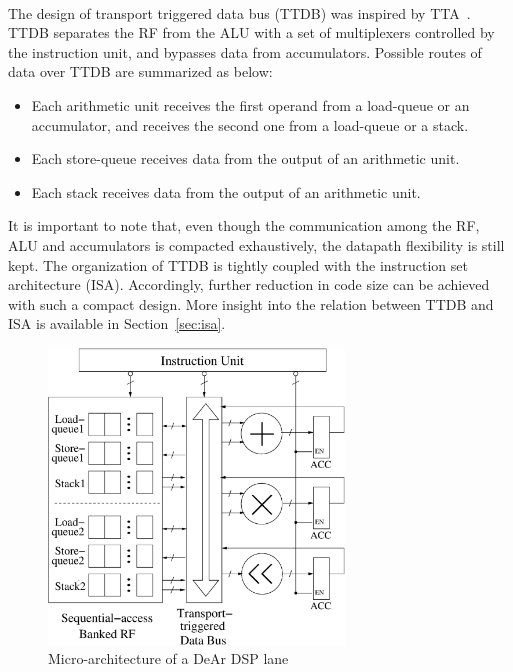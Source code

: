 \\\indent
The design of transport triggered data bus (TTDB) was inspired by TTA~\cite{move}.
TTDB separates the RF from the ALU with a set of multiplexers controlled by the instruction unit, 
and bypasses data from accumulators.
Possible routes of data over TTDB are summarized as below:
\begin{itemize}
    \item Each arithmetic unit receives the first operand from a load-queue or an accumulator, 
        and receives the second one from a load-queue or a stack.
    \item Each store-queue receives data from the output of an arithmetic unit.
    \item Each stack receives data from the output of an arithmetic unit.
\end{itemize}
\indent
It is important to note that, even though the communication among the RF, ALU and accumulators is compacted exhaustively, 
the datapath flexibility is still kept.
The organization of TTDB is tightly coupled with the instruction set architecture (ISA).
Accordingly, further reduction in code size can be achieved with such a compact design.
More insight into the relation between TTDB and ISA is available in Section~\ref{sec:isa}.

\vspace{\textfig}
\begin{figure}[!ht] 
    \centering
    \includegraphics[width=0.7\textwidth]{./figs/micro.eps}
    \caption{Micro-architecture of a DeAr DSP lane}
    \label{fig:micro}
\end{figure}


